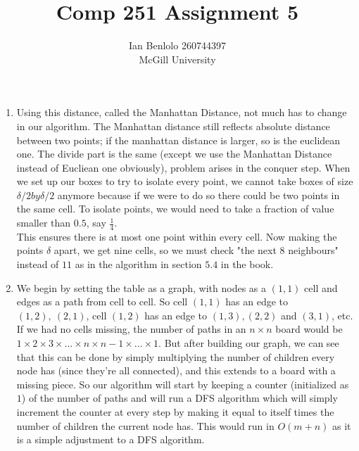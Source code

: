 
\usepackage{cancel}
\usepackage{verbatim}
\usepackage{enumerate}
\usepackage{appendix}
\title{Comp 251 Assignment 5}
\author{Ian Benlolo 260744397\\McGill University \\}

\maketitle
\begin{enumerate}[1.]
\item 
	Using this distance, called the Manhattan Distance, not much has to change in our algorithm. The Manhattan distance still reflects absolute distance between two points; if the manhattan distance is larger, so is the euclidean one. The divide part is the same (except we use the Manhattan Distance instead of Eucliean one obviously), problem arises in the conquer step. When we set up our boxes to try to isolate every point, we cannot take boxes of size $\delta/2 by \delta/2$ anymore because if we were to do so there could be two points in the same cell. To isolate points, we would need to take a fraction of value smaller than $0.5$, say $\frac{1}{4}$.\\
	This ensures there is at most one point within every cell. Now making the points $\delta$ apart, we get nine cells, so we must check "the next $8$ neighbours" instead of $11$ as in the algorithm in section $5.4$ in the book. 
	
	\item
		We begin by setting the table as a graph, with nodes as a $(1,1)$ cell and edges as a path from cell to cell. So cell $(1,1)$ has an edge to $(1,2),\ (2,1)$, cell $(1,2)$ has an edge to $(1,3), (2,2)$ and $(3,1)$, etc. If we had no cells missing, the number of paths in an $n\times n $ board would be $1\times 2\times 3\times \dots \times n \times n-1 \times \dots \times 1$. But after building our graph, we can see that this can be done by simply multiplying the number of children every node has (since they're all connected), and this extends to a board with a missing piece. So our algorithm will start by keeping a counter (initialized as $1$) of the number of paths and will run a DFS algorithm which will simply increment the counter at every step by making it equal to itself times the number of children the current node has. This would run in $O(m+n)$ as it is a simple adjustment to a DFS algorithm.
	

\end{enumerate}
